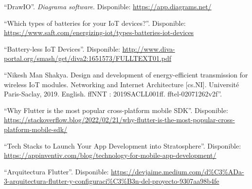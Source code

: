 \begin{references}
    “DrawIO”. \textit{Diagrama software}. Disponible: \url{https://app.diagrams.net/}

    “Which types of batteries for your IoT devices?”. Disponible: \url{https://www.saft.com/energizing-iot/types-batteries-iot-devices}

    “Battery-less IoT Devices”. Disponible: \url{http://www.diva-portal.org/smash/get/diva2:1651573/FULLTEXT01.pdf}

    “Nikesh Man Shakya. Design and development of energy-efficient transmission for wireless IoT modules. Networking and Internet Architecture [cs.NI]. Université Paris-Saclay, 2019. English. ffNNT :
    2019SACLL001ff. fftel-02071262v2f”.

    “Why Flutter is the most popular cross-platform mobile SDK”. Disponible: \url{https://stackoverflow.blog/2022/02/21/why-flutter-is-the-most-popular-cross-platform-mobile-sdk/}

    “Tech Stacks to Launch Your App Development into Stratosphere”. Disponible: \url{https://appinventiv.com/blog/technology-for-mobile-app-development/}

    “Arquitectura Flutter”. Disponible: \url{https://devjaime.medium.com/d%C3%ADa-3-arquitectura-flutter-y-configuraci%C3%B3n-del-proyecto-9307aa98b4fe}

\end{references}

